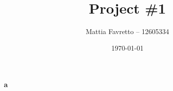 \documentclass[11pt,a4paper]{article}
\author{Mattia Favretto -- 12605334}
\title{Project \#1}
\date{\today}
\begin{document}
 
\maketitle

\paragraph{a}
\end{document}
